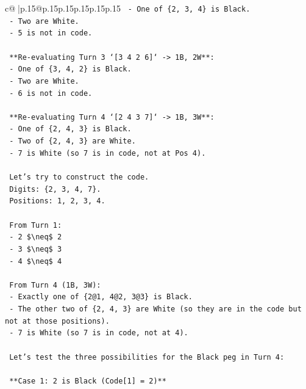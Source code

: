 \documentclass{article}
\begin{document}
{\begin{supertabular}{c@{$\;$}|p{.15\linewidth}@{}p{.15\linewidth}p{.15\linewidth}p{.15\linewidth}p{.15\linewidth}p{.15\linewidth}}
{{{\texttt{        {-} One of \{2, 3, 4\} is Black.} \\
\texttt{        {-} Two are White.} \\
\texttt{        {-} 5 is not in code.} \\
\\ 
\texttt{        **Re{-}evaluating Turn 3 `{[}3 4 2 6{]}` {-}> 1B, 2W**:} \\
\texttt{        {-} One of \{3, 4, 2\} is Black.} \\
\texttt{        {-} Two are White.} \\
\texttt{        {-} 6 is not in code.} \\
\\ 
\texttt{        **Re{-}evaluating Turn 4 `{[}2 4 3 7{]}` {-}> 1B, 3W**:} \\
\texttt{        {-} One of \{2, 4, 3\} is Black.} \\
\texttt{        {-} Two of \{2, 4, 3\} are White.} \\
\texttt{        {-} 7 is White (so 7 is in code, not at Pos 4).} \\
\\ 
\texttt{        Let's try to construct the code.} \\
\texttt{        Digits: \{2, 3, 4, 7\}.} \\
\texttt{        Positions: 1, 2, 3, 4.} \\
\\ 
\texttt{        From Turn 1:} \\
\texttt{        {-} 2 \$\textbackslash{}neq\$ 2} \\
\texttt{        {-} 3 \$\textbackslash{}neq\$ 3} \\
\texttt{        {-} 4 \$\textbackslash{}neq\$ 4} \\
\\ 
\texttt{        From Turn 4 (1B, 3W):} \\
\texttt{        {-} Exactly one of \{2@1, 4@2, 3@3\} is Black.} \\
\texttt{        {-} The other two of \{2, 4, 3\} are White (so they are in the code but not at those positions).} \\
\texttt{        {-} 7 is White (so 7 is in code, not at 4).} \\
\\ 
\texttt{        Let's test the three possibilities for the Black peg in Turn 4:} \\
\\ 
\texttt{        **Case 1: 2 is Black (Code{[}1{]} = 2)**} \\
}}}
\end{supertabular}}
\end{document}
